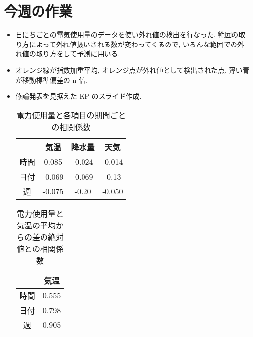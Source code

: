 \section{今週の作業}
\begin{itemize}
    \item 日にちごとの電気使用量のデータを使い外れ値の検出を行なった. 範囲の取り方によって外れ値扱いされる数が変わってくるので, いろんな範囲での外れ値の取り方をして予測に用いる. 
    \item オレンジ線が指数加重平均, オレンジ点が外れ値として検出された点, 薄い青が移動標準偏差の n 倍. 
    \item 修論発表を見据えた KP のスライド作成. 
\begin{table}[t]
\centering
  \caption{電力使用量と各項目の期間ごとの相関係数}
  \vspace{3mm}
  \begin{tabular}{|c||c|c|c|} \hline
     &  気温 & 降水量 & 天気 \\ \hline \hline
    時間 & 0.085 & -0.024 & -0.014 \\ \hline
    日付 & -0.069 & -0.069 & -0.13 \\ \hline
    週 & -0.075 & -0.20 & -0.050 \\ \hline
  \end{tabular}
\end{table}
\begin{table}[t]
\centering
  \caption{電力使用量と気温の平均からの差の絶対値との相関係数}
  \vspace{3mm}
  \begin{tabular}{|c||c|} \hline
     &  気温 \\ \hline \hline
    時間 & 0.555 \\ \hline
    日付 & 0.798 \\ \hline
    週 & 0.905 \\ \hline
  \end{tabular}
\end{table}
\begin{table}[t]

\end{table}
\end{itemize}
